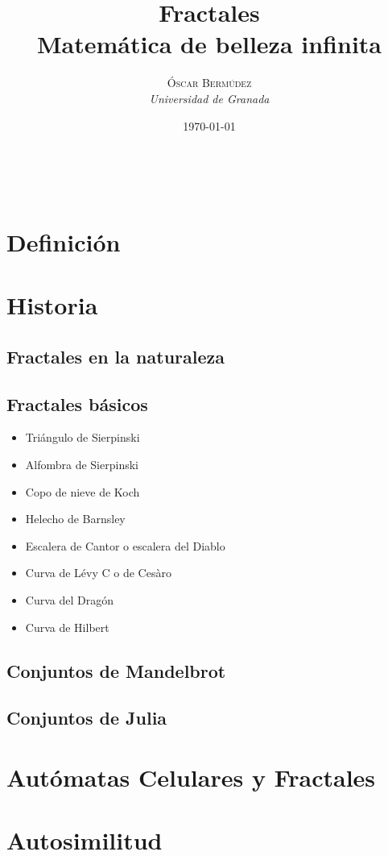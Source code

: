 \documentclass[a4paper, 11pt]{article} %
\title{\textbf{Fractales}\\ %
Matemática de belleza infinita} %
\author{\textsc{Óscar Bermúdez} %
\\{\textit{Universidad de Granada}}} %
\date{\today} %
\makeatletter
\renewcommand{\maketitle}{ %
\begin{flushright} %
{\LARGE\@title} %

\vspace{50pt} %

{\large\@author} %
\\\@date %

\vspace{40pt} %
\end{flushright}
}
\makeatother
\begin{document}
\maketitle %

{\parskip=2pt
\tableofcontents
}
\pagebreak

\section{Definición}
\section{Historia}
	\subsection{Fractales en la naturaleza}
	\subsection{Fractales básicos}
		\begin{itemize}
			\item Triángulo de Sierpinski
			\item Alfombra de Sierpinski
			\item Copo de nieve de Koch
			\item Helecho de Barnsley
			\item Escalera de Cantor o escalera del Diablo %
			\item Curva de Lévy C o de Cesàro
			\item Curva del Dragón
			\item Curva de Hilbert
		\end{itemize}
	\subsection{Conjuntos de Mandelbrot}
	\subsection{Conjuntos de Julia}
\section{Autómatas Celulares y Fractales}
\section{Autosimilitud}
\end{document}

